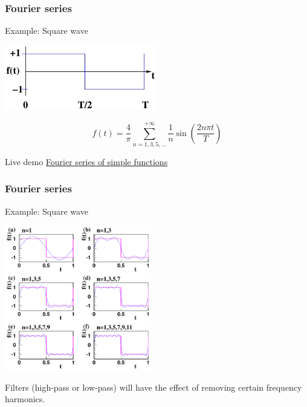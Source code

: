 \documentclass[beamer]{standalone}
\begin{document}
\begin{frame}[t]
 \frametitle{Fourier series}
 \begin{block}{Example: Square wave}
  \begin{center}
   \includegraphics[width=0.5\textwidth]{pics/square_wave}
  \end{center}
  \[ f(t) = \frac{4}{\pi} \sum_{n=1,3,5,\ldots}^{+\infty} \frac{1}{n} \sin\left(\frac{2n\pi t}{T}\right) \]
 \end{block}
 \begin{block}{Live demo}
  \href{http://demonstrations.wolfram.com/FourierSeriesOfSimpleFunctions}{Fourier series of simple functions}
 \end{block}
\end{frame}

\begin{frame}[t]
 \frametitle{Fourier series}
 \begin{block}{Example: Square wave}
  \begin{center}
   \includegraphics[width=0.48\textwidth]{pics/square_wave_approximation}
  \end{center}
  Filters (high-pass or low-pass) will have the effect of removing certain frequency harmonics.
 \end{block}
\end{frame}
\end{document}
